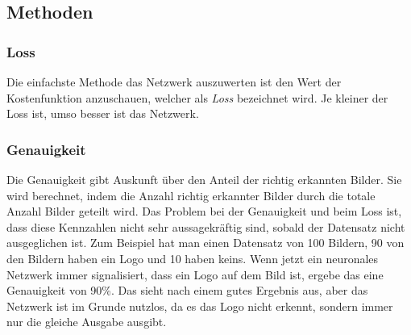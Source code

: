 \documentclass[12pt,a4paper]{report}
\begin{document}
\subsection{Methoden}
\subsubsection{Loss}
Die einfachste Methode das Netzwerk auszuwerten ist den Wert der Kostenfunktion anzuschauen, welcher als \textit{Loss} bezeichnet wird.
Je kleiner der Loss ist, umso besser ist das Netzwerk.

\subsubsection{Genauigkeit}
Die Genauigkeit gibt Auskunft über den Anteil der richtig erkannten Bilder.
Sie wird berechnet, indem die Anzahl richtig erkannter Bilder durch die totale Anzahl Bilder geteilt wird.
Das Problem bei der Genauigkeit und beim Loss ist, dass diese Kennzahlen nicht sehr aussagekräftig sind,
sobald der Datensatz nicht ausgeglichen ist.
Zum Beispiel hat man einen Datensatz von 100 Bildern, 90 von den Bildern haben ein Logo und 10 haben keins.
Wenn jetzt ein neuronales Netzwerk immer signalisiert, dass ein Logo auf dem Bild ist, ergebe das eine Genauigkeit von 90\%.
Das sieht nach einem gutes Ergebnis aus, aber das Netzwerk ist im Grunde nutzlos, da es das Logo nicht erkennt,
sondern immer nur die gleiche Ausgabe ausgibt.
\end{document}
